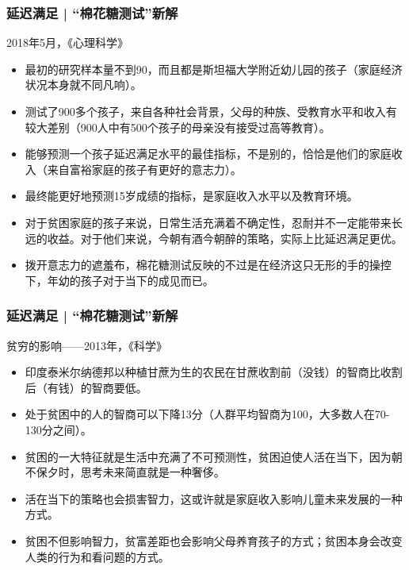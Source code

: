 \begin{frame}
  \frametitle{延迟满足 | “棉花糖测试”新解}
  \begin{block}{2018年5月，《心理科学》}
    \begin{itemize}
      \item 最初的研究样本量不到90，而且都是斯坦福大学附近幼儿园的孩子（家庭经济状况本身就不同凡响）。
      \item 测试了900多个孩子，来自各种社会背景，父母的种族、受教育水平和收入有较大差别（900人中有500个孩子的母亲没有接受过高等教育）。
      \item 能够预测一个孩子延迟满足水平的最佳指标，不是别的，恰恰是他们的家庭收入（\alert{来自富裕家庭的孩子有更好的意志力}）。
      \item 最终能更好地预测15岁成绩的指标，是家庭收入水平以及教育环境。
      \item 对于贫困家庭的孩子来说，日常生活充满着不确定性，忍耐并不一定能带来长远的收益。对于他们来说，今朝有酒今朝醉的策略，实际上比延迟满足更优。
      \item 拨开意志力的遮羞布，棉花糖测试反映的不过是在经济这只无形的手的操控下，年幼的孩子对于当下的成见而已。
    \end{itemize}
  \end{block}
\end{frame}

\begin{frame}
  \frametitle{延迟满足 | “棉花糖测试”新解}
  \begin{block}{贫穷的影响——2013年，《科学》}
    \begin{itemize}
      \item 印度泰米尔纳德邦以种植甘蔗为生的农民在甘蔗收割前（没钱）的智商比收割后（有钱）的智商要低。
      \item 处于贫困中的人的智商可以下降13分（人群平均智商为100，大多数人在70-130分之间）。
      \item 贫困的一大特征就是生活中充满了不可预测性，贫困迫使人活在当下，因为朝不保夕时，思考未来简直就是一种奢侈。
      \item 活在当下的策略也会损害智力，这或许就是家庭收入影响儿童未来发展的一种方式。
      \item 贫困不但影响智力，贫富差距也会影响父母养育孩子的方式；\alert{贫困本身会改变人类的行为和看问题的方式}。
    \end{itemize}
  \end{block}
\end{frame}

